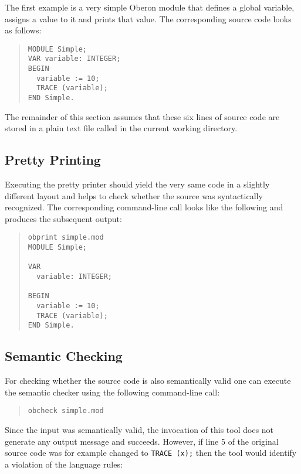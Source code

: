 The first example is a very simple Oberon module that defines a global variable, assigns a value to it and prints that value.
The corresponding source code looks as follows:

\begin{quote}\begin{verbatim}
MODULE Simple;
VAR variable: INTEGER;
BEGIN
  variable := 10;
  TRACE (variable);
END Simple.
\end{verbatim}\end{quote}

The remainder of this section assumes that these six lines of source code are stored in a plain text file called  in the current working directory.

\subsection{Pretty Printing}

Executing the pretty printer should yield the very same code in a slightly different layout and helps to check whether the source was syntactically recognized.
The corresponding command-line call looks like the following and produces the subsequent output:

\begin{quote}\begin{verbatim}
obprint simple.mod
MODULE Simple;

VAR
  variable: INTEGER;

BEGIN
  variable := 10;
  TRACE (variable);
END Simple.
\end{verbatim}\end{quote}

\subsection{Semantic Checking}

For checking whether the source code is also semantically valid one can execute the semantic checker using the following command-line call:

\begin{quote}\begin{verbatim}
obcheck simple.mod
\end{verbatim}\end{quote}

Since the input was semantically valid, the invocation of this tool does not generate any output message and succeeds.
However, if line 5 of the original source code was for example changed to \texttt{TRACE (x);} then the tool would identify a violation of the language rules:

